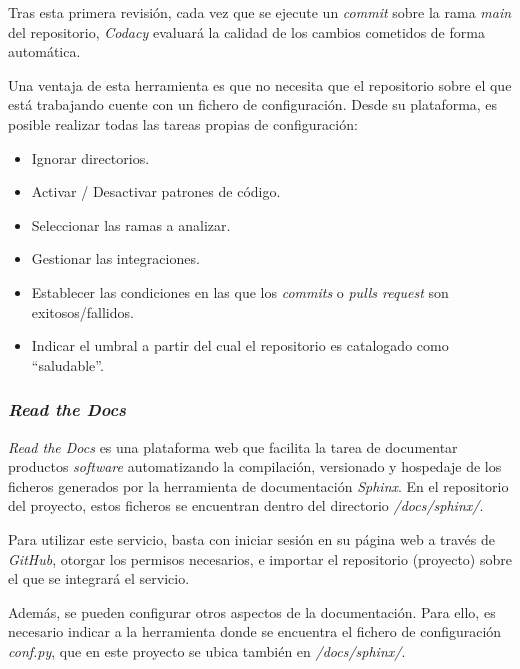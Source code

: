 
Tras esta primera revisión, cada vez que se ejecute un \emph{commit}
sobre la rama \emph{main} del repositorio, \emph{Codacy} evaluará la
calidad de los cambios cometidos de forma automática.

Una ventaja de esta herramienta es que no necesita que el repositorio
sobre el que está trabajando cuente con un fichero de configuración.
Desde su plataforma, es posible realizar todas las tareas propias de
configuración:

\begin{itemize}
\tightlist
\item
  Ignorar directorios.
\item
  Activar / Desactivar patrones de código.
\item
  Seleccionar las ramas a analizar.
\item
  Gestionar las integraciones.
\item
  Establecer las condiciones en las que los \emph{commits} o \emph{pulls
  request} son exitosos/fallidos.
\item
  Indicar el umbral a partir del cual el repositorio es catalogado como
  ``saludable''.
\end{itemize}

\subsubsection{\emph{Read the Docs}}

\emph{Read the Docs} es una plataforma web que facilita la tarea de
documentar productos \emph{software} automatizando la compilación,
versionado y hospedaje de los ficheros generados por la herramienta de
documentación \emph{Sphinx}. En el repositorio del proyecto, estos
ficheros se encuentran dentro del directorio \emph{/docs/sphinx/}.

Para utilizar este servicio, basta con iniciar sesión en su página web a
través de \emph{GitHub}, otorgar los permisos necesarios, e importar el
repositorio (proyecto) sobre el que se integrará el servicio.

Además, se pueden configurar otros aspectos de la documentación. Para
ello, es necesario indicar a la herramienta donde se encuentra el
fichero de configuración \emph{conf.py}, que en este proyecto se ubica
también en \emph{/docs/sphinx/}.


